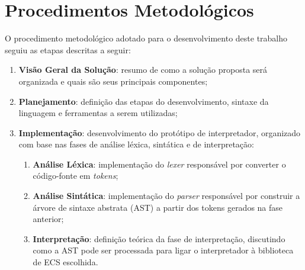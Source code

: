 \section{Procedimentos Metodológicos}

O procedimento metodológico adotado para o desenvolvimento deste trabalho seguiu as etapas descritas a seguir:

\begin{enumerate}
    \item \textbf{Visão Geral da Solução}: resumo de como a solução proposta será organizada e quais são seus principais componentes;
    \item \textbf{Planejamento}: definição das etapas do desenvolvimento, sintaxe da linguagem e ferramentas a serem utilizadas;
    \item \textbf{Implementação}: desenvolvimento do protótipo de interpretador, organizado com base nas fases de análise léxica, sintática e de interpretação:
          \begin{enumerate}
              \item \textbf{Análise Léxica}: implementação do \textit{lexer} responsável por converter o código-fonte em \textit{tokens};
              \item \textbf{Análise Sintática}: implementação do \textit{parser} responsável por construir a árvore de sintaxe abstrata (AST) a partir dos tokens gerados na fase anterior;
              \item \textbf{Interpretação}: definição teórica da fase de interpretação, discutindo como a AST pode ser processada para ligar o interpretador à biblioteca de ECS escolhida.
          \end{enumerate}
\end{enumerate}